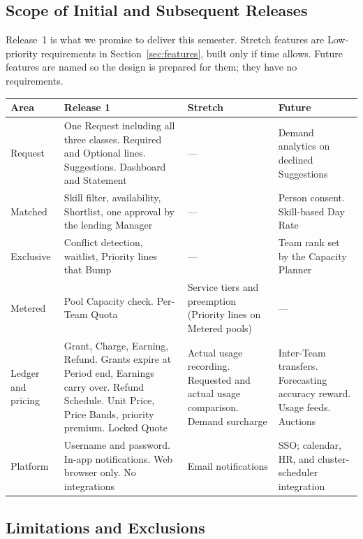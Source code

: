 \subsection{Scope of Initial and Subsequent Releases}

Release~1 is what we promise to deliver this semester. Stretch features are Low-priority requirements in Section~\ref{sec:features}, built only if time allows. Future features are named so the design is prepared for them; they have no requirements.

{\footnotesize\renewcommand{\arraystretch}{1.05}
\begin{tabularx}{\textwidth}{@{}L{1.7cm}>{\hsize}Y>{\hsize}Y>{\hsize}Y@{}}
\toprule
\textbf{Area} & \textbf{Release 1} & \textbf{Stretch} & \textbf{Future} \\
\midrule
Request & One Request including all three classes. Required and Optional lines. Suggestions. Dashboard and Statement & --- & Demand analytics on declined Suggestions \\
Matched & Skill filter, availability, Shortlist, one approval by the lending Manager & --- & Person consent. Skill-based Day Rate \\
Exclusive & Conflict detection, waitlist, Priority lines that Bump & --- & Team rank set by the Capacity Planner \\
Metered & Pool Capacity check. Per-Team Quota & Service tiers and preemption (Priority lines on Metered pools) & --- \\
Ledger and pricing & Grant, Charge, Earning, Refund. Grants expire at Period end, Earnings carry over. Refund Schedule. Unit Price, Price Bands, priority premium. Locked Quote & Actual usage recording. Requested and actual usage comparison. Demand surcharge & Inter-Team transfers. Forecasting accuracy reward. Usage feeds. Auctions \\
Platform & Username and password. In-app notifications. Web browser only. No integrations & Email notifications & SSO; calendar, HR, and cluster-scheduler integration \\
\bottomrule
\end{tabularx}
}

\subsection{Limitations and Exclusions}


